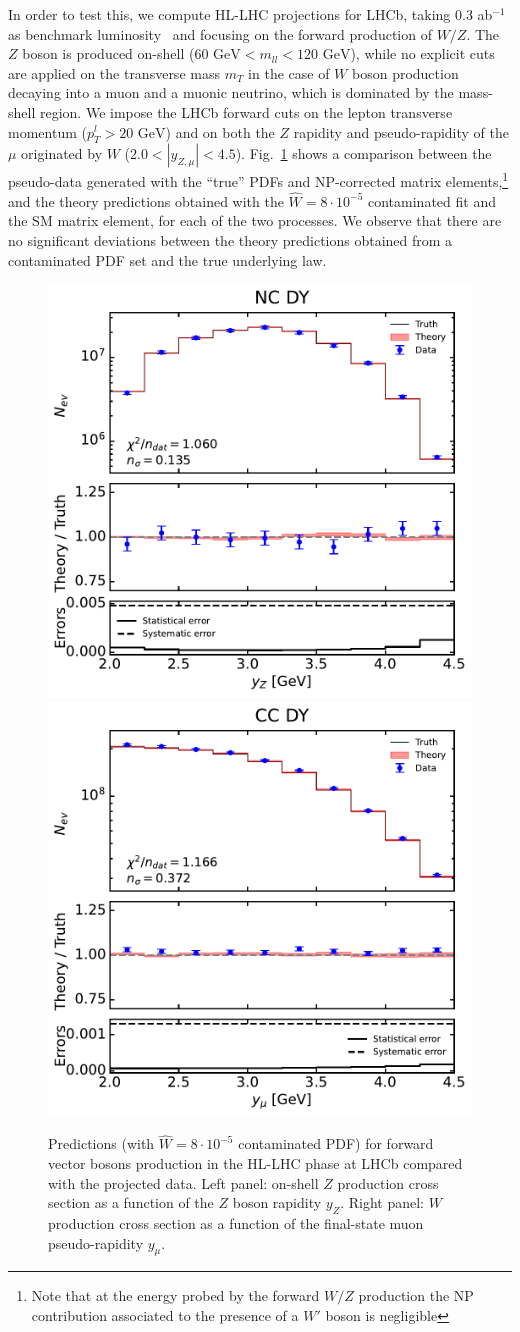 \documentclass[withindex,glossary]{cam-thesis}
\begin{document}
In order to test this, we compute HL-LHC projections for LHCb, taking 0.3 ab$^{-1}$ as benchmark luminosity~\cite{Azzi:2019yne} 
and focusing on the forward production of $W/Z$. The $Z$ boson is produced on-shell 
($60 \text{ GeV} < m_{ll} < 120 \text{ GeV}$), while no explicit cuts are applied on  the transverse mass $m_T$ in 
the case of $W$ boson production decaying into a muon and a muonic neutrino, which is dominated by the mass-shell region. 
We impose the LHCb forward cuts on the lepton transverse momentum ($p^l_T > 20 \text{ GeV}$) 
and on both the $Z$ rapidity and pseudo-rapidity of the $\mu$ originated by $W$ ($2.0 < |y_{Z,\mu}| < 4.5$).
Fig.~\ref{fig:forwardZ_hllhc} shows a comparison between the pseudo-data generated with the ``true'' PDFs and NP-corrected matrix elements,\footnote{Note that at the energy probed by the 
forward $W/Z$ production the NP contribution associated to the presence of a $W'$ boson is negligible} and the theory predictions 
obtained with the $\hat{W}=8\cdot 10^{-5}$ contaminated fit and the SM matrix element, for each of the two processes.
We observe that there are no significant deviations between the theory predictions obtained from a 
contaminated PDF set and the true underlying law. 
%
\begin{figure}[htb]
  \centering
  \includegraphics[width=0.49\linewidth]{Figures/LHCb_NC_DY_HL_fluc.pdf}
  \includegraphics[width=0.49\linewidth]{Figures/LHCb_CCp_DY_HL_fluc.pdf}
  \caption{Predictions (with $\hat{W}=8\cdot 10^{-5}$ contaminated PDF) for forward vector bosons production 
  in the HL-LHC phase at LHCb compared with the projected data. Left panel: on-shell $Z$ production cross section as a 
  function of the $Z$ boson rapidity $y_Z$. Right panel: $W$ production cross section as a function of the final-state muon
  pseudo-rapidity $y_\mu$.}
  \label{fig:forwardZ_hllhc}
\end{figure}
\end{document}
